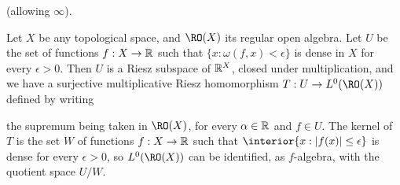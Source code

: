 
\noindent (allowing $\infty$).

 Let $X$ be any topological space, and
$\RO(X)$ its regular open algebra.   Let $U$ be the set of functions
$f:X\to\Bbb R$ such that $\{x:\omega(f,x)<\epsilon\}$ is dense in $X$
for every $\epsilon>0$.  Then $U$ is a Riesz subspace of $\Bbb R^X$,
closed under multiplication, and we have a surjective multiplicative
Riesz homomorphism $T:U\to L^0(\RO(X))$ defined by writing


\noindent the supremum being taken in $\RO(X)$, for every
$\alpha\in\Bbb R$ and $f\in U$.   The kernel of $T$ is
the set $W$ of functions $f:X\to\Bbb R$ such that
$\interior\{x:|f(x)|\le\epsilon\}$ is dense for every $\epsilon>0$, so
$L^0(\RO(X))$ can be identified, as $f$-algebra, with the
quotient space $U/W$.

